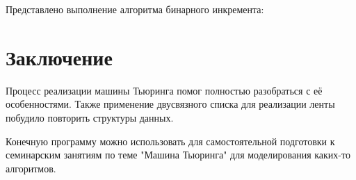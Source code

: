 Представлено выполнение алгоритма бинарного инкремента:





\newpage


\section*{Заключение}

Процесс реализации машины Тьюринга помог полностью разобраться с её особенностями. Также применение двусвязного списка для реализации ленты побудило повторить структуры данных. 

Конечную программу можно использовать для самостоятельной подготовки к семинарским занятиям по теме "Машина Тьюринга" для моделирования каких-то алгоритмов.
